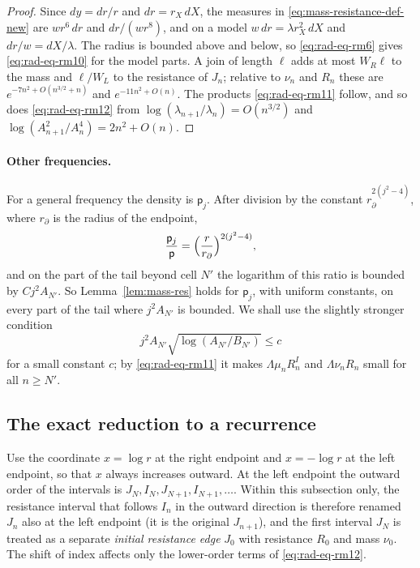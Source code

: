 \begin{proof}
Since $dy=dr/r$ and $dr=r_X\,dX$, the measures in
\eqref{eq:mass-resistance-def-new} are $wr^6\,dr$ and $dr/(wr^8)$,
and on a model $w\,dr=\lambda r_X^2\,dX$ and $dr/w=dX/\lambda$. The
radius is bounded above and below, so \eqref{eq:rad-eq-rm6} gives
\eqref{eq:rad-eq-rm10} for the model parts. A join of length $\ell$
adds at most $W_R\ell$ to the mass and $\ell/W_L$ to the resistance of
$J_n$; relative to $\nu_n$ and $R_n$ these are
$e^{-7n^2+O(n^{3/2}+n)}$ and $e^{-11n^2+O(n)}$. The products
\eqref{eq:rad-eq-rm11} follow, and so does \eqref{eq:rad-eq-rm12}
from $\log(\lambda_{n+1}/\lambda_n)=O(n^{3/2})$ and
$\log(A_{n+1}^2/A_n^4)=2n^2+O(n)$.
\end{proof}

\paragraph{Other frequencies.}
For a general frequency the density is $\mathsf p_j$. After division
by the constant $r_\partial^{2(j^2-4)}$, where $r_\partial$ is the
radius of the endpoint,
\[
 \frac{\mathsf p_j}{\mathsf p}
 =\Bigl(\frac r{r_\partial}\Bigr)^{2(j^2-4)},
\]
and on the part of the tail beyond cell $N'$ the logarithm of this
ratio is bounded by $Cj^2A_{N'}$. So
Lemma~\ref{lem:mass-res} holds for $\mathsf p_j$, with uniform
constants, on every part of the tail where $j^2A_{N'}$ is bounded. We
shall use the slightly stronger condition
\begin{equation}\label{eq:deep-frequency-condition-new}
 j^2A_{N'}\sqrt{\log(A_{N'}/B_{N'})}\le c
\end{equation}
for a small constant $c$; by \eqref{eq:rad-eq-rm11} it makes
$\Lambda\mu_nR_n^I$ and $\Lambda\nu_nR_n$ small for all $n\ge N'$.

\subsection{The exact reduction to a recurrence}
\label{subsec:exact-reduction}

Use the coordinate $x=\log r$ at the right endpoint and $x=-\log r$ at
the left endpoint, so that $x$ always increases outward. At the left
endpoint the outward order of the intervals is
$J_N,I_N,J_{N+1},I_{N+1},\ldots$. Within this subsection only, the
resistance interval that follows $I_n$ in the outward direction is
therefore renamed $J_n$ also at the left endpoint (it is the original
$J_{n+1}$), and the first interval $J_N$ is treated as a separate
\emph{initial resistance edge} $J_0$ with resistance $R_0$ and mass
$\nu_0$. The shift of index affects only the lower-order terms of
\eqref{eq:rad-eq-rm12}.

